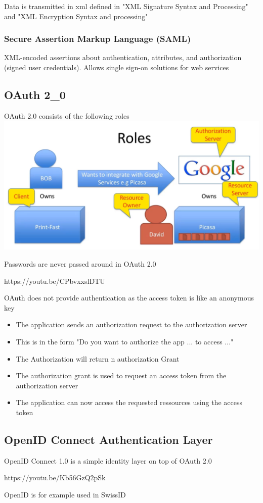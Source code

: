 \documentclass[12pt]{article}
\begin{document}
Data is transmitted in xml defined in "XML Signature Syntax and Processing" and "XML Encryption Syntax and processing"

\subsubsection*{Secure Assertion Markup Language (SAML)}
XML-encoded assertions about authentication, attributes, and authorization (signed user credentials). Allows single sign-on solutions for web services

\subsection*{OAuth 2_0}
OAuth 2.0 consists of the following roles
\includegraphics[width=\textwidth]{OAuth20Roles.png}

Passwords are never passed around in OAuth 2.0

https://youtu.be/CPbvxxslDTU

OAuth does not provide authentication as the access token is like an anonymous key

\begin{itemize}
    \item The application sends an authorization request to the authorization server
    \item This is in the form "Do you want to authorize the app ... to access ..."
    \item The Authorization will return n authorization Grant
    \item The authorization grant is used to request an access token from the authorization server
    \item The application can now access the requested ressources using the access token
\end{itemize}

\subsection*{OpenID Connect Authentication Layer}
OpenID Connect 1.0 is a simple identity layer on top of OAuth 2.0

https://youtu.be/Kb56GzQ2pSk

OpenID is for example used in SwissID
\end{document}
